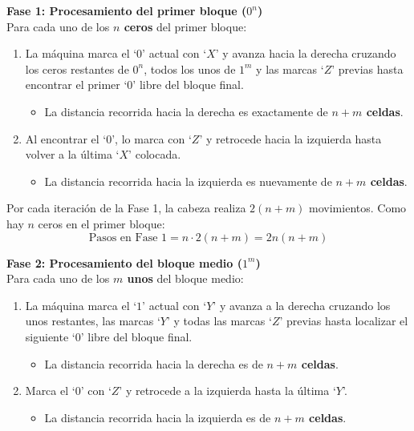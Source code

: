 \vspace{0.2cm}
\noindent\textbf{Fase 1: Procesamiento del primer bloque ($0^n$)}\\
Para cada uno de los \textbf{$n$ ceros} del primer bloque:
\begin{enumerate}[label=\arabic*., leftmargin=*]
    \item La máquina marca el `$0$' actual con `$X$' y avanza hacia la derecha cruzando los ceros restantes de $0^n$, todos los unos de $1^m$ y las marcas `$Z$' previas hasta encontrar el primer `$0$' libre del bloque final.
    \begin{itemize}[leftmargin=*]
        \item La distancia recorrida hacia la derecha es exactamente de \textbf{$n + m$ celdas}.
    \end{itemize}
    \item Al encontrar el `$0$', lo marca con `$Z$' y retrocede hacia la izquierda hasta volver a la última `$X$' colocada.
    \begin{itemize}[leftmargin=*]
        \item La distancia recorrida hacia la izquierda es nuevamente de \textbf{$n + m$ celdas}.
    \end{itemize}
\end{enumerate}

Por cada iteración de la Fase 1, la cabeza realiza $2(n + m)$ movimientos. Como hay $n$ ceros en el primer bloque:
\[\text{Pasos en Fase 1} = n \cdot 2(n + m) = 2n(n + m)\]

\vspace{0.3cm}
\noindent\textbf{Fase 2: Procesamiento del bloque medio ($1^m$)}\\
Para cada uno de los \textbf{$m$ unos} del bloque medio:
\begin{enumerate}[label=\arabic*., leftmargin=*]
    \item La máquina marca el `$1$' actual con `$Y$' y avanza a la derecha cruzando los unos restantes, las marcas `$Y$' y todas las marcas `$Z$' previas hasta localizar el siguiente `$0$' libre del bloque final.
    \begin{itemize}[leftmargin=*]
        \item La distancia recorrida hacia la derecha es de \textbf{$n + m$ celdas}.
    \end{itemize}
    \item Marca el `$0$' con `$Z$' y retrocede a la izquierda hasta la última `$Y$'.
    \begin{itemize}[leftmargin=*]
        \item La distancia recorrida hacia la izquierda es de \textbf{$n + m$ celdas}.
    \end{itemize}
\end{enumerate}

